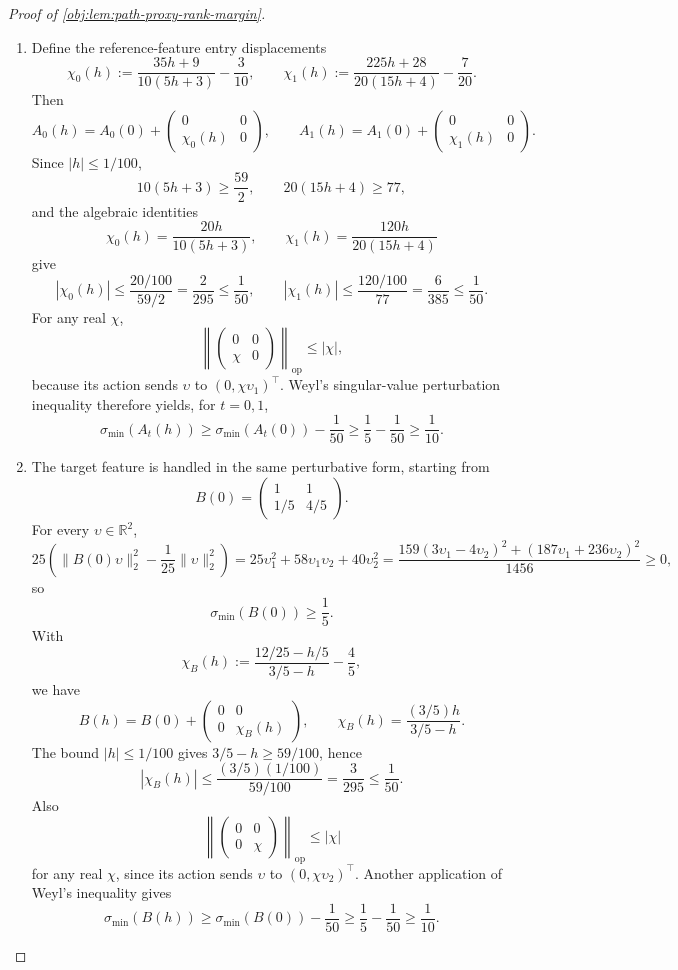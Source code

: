 \documentclass[11pt]{article}
\begin{document}
\begin{proof}[Proof of \cref{obj:lem:path-proxy-rank-margin}]
\begin{enumerate}
\item Define the reference-feature entry displacements
\[
\chi_0(h):=\frac{35h+9}{10(5h+3)}-\frac3{10},
\qquad
\chi_1(h):=\frac{225h+28}{20(15h+4)}-\frac7{20}.
\]
Then
\[
A_0(h)=A_0(0)+\begin{pmatrix}0&0\\ \chi_0(h)&0\end{pmatrix},
\qquad
A_1(h)=A_1(0)+\begin{pmatrix}0&0\\ \chi_1(h)&0\end{pmatrix}.
\]
Since \(|h|\le1/100\),
\[
10(5h+3)\ge \frac{59}{2},
\qquad
20(15h+4)\ge 77,
\]
and the algebraic identities
\[
\chi_0(h)=\frac{20h}{10(5h+3)},
\qquad
\chi_1(h)=\frac{120h}{20(15h+4)}
\]
give
\[
|\chi_0(h)|\le \frac{20/100}{59/2}=\frac{2}{295}\le\frac1{50},
\qquad
|\chi_1(h)|\le \frac{120/100}{77}=\frac{6}{385}\le\frac1{50}.
\]
For any real \(\chi\),
\[
\left\|
\begin{pmatrix}0&0\\ \chi&0\end{pmatrix}
\right\|_{\mathrm{op}}\le |\chi|,
\]
because its action sends \(\upsilon\) to \((0,\chi\upsilon_1)^\top\). Weyl's singular-value perturbation inequality therefore yields, for \(t=0,1\),
\[
\sigma_{\min}(A_t(h))
\ge
\sigma_{\min}(A_t(0))-\frac1{50}
\ge
\frac15-\frac1{50}
\ge
\frac1{10}.
\] %

\item The target feature is handled in the same perturbative form, starting from
\[
B(0)=
\begin{pmatrix}1&1\\[0.2em]1/5&4/5\end{pmatrix}.
\]
For every \(\upsilon\in\mathbb R^2\),
\[
25\left(\|B(0)\upsilon\|_2^2-\frac1{25}\|\upsilon\|_2^2\right)
=
25\upsilon_1^2+58\upsilon_1\upsilon_2+40\upsilon_2^2
=
\frac{159(3\upsilon_1-4\upsilon_2)^2+(187\upsilon_1+236\upsilon_2)^2}{1456}\ge0,
\]
so
\[
\sigma_{\min}(B(0))\ge\frac15.
\]
With
\[
\chi_B(h):=\frac{12/25-h/5}{3/5-h}-\frac45,
\]
we have
\[
B(h)=B(0)+\begin{pmatrix}0&0\\0&\chi_B(h)\end{pmatrix},
\qquad
\chi_B(h)=\frac{(3/5)h}{3/5-h}.
\]
The bound \(|h|\le1/100\) gives \(3/5-h\ge59/100\), hence
\[
|\chi_B(h)|
\le
\frac{(3/5)(1/100)}{59/100}
=
\frac{3}{295}
\le
\frac1{50}.
\]
Also
\[
\left\|
\begin{pmatrix}0&0\\0&\chi\end{pmatrix}
\right\|_{\mathrm{op}}\le|\chi|
\]
for any real \(\chi\), since its action sends \(\upsilon\) to \((0,\chi\upsilon_2)^\top\). Another application of Weyl's inequality gives
\[
\sigma_{\min}(B(h))
\ge
\sigma_{\min}(B(0))-\frac1{50}
\ge
\frac15-\frac1{50}
\ge
\frac1{10}.
\] %


\end{enumerate}
\end{proof}
\end{document}
